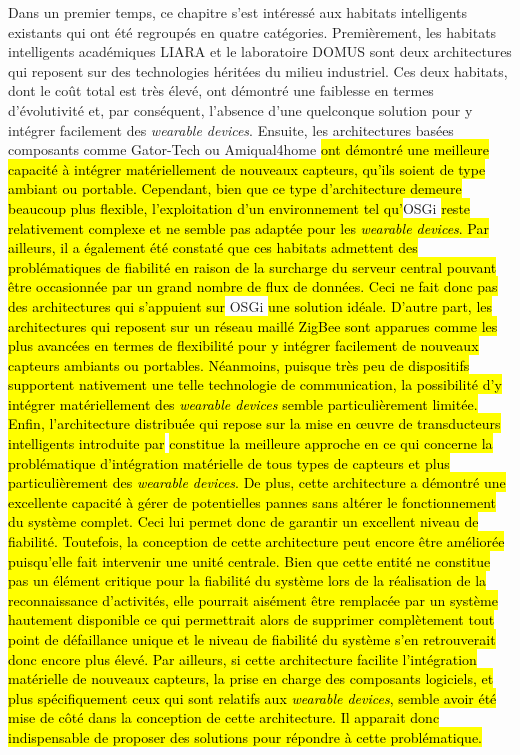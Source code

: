 Dans un premier temps, ce chapitre s'est intéressé aux habitats intelligents existants qui ont été regroupés en quatre catégories. Premièrement, les habitats intelligents académiques \acs{LIARA} et le laboratoire \acs{DOMUS} sont deux architectures qui reposent sur des technologies héritées du milieu industriel. Ces deux habitats, dont le coût total est très élevé, ont démontré une faiblesse en termes d'évolutivité et, par conséquent, l'absence d'une quelconque solution pour y intégrer facilement des \textit{wearable devices}. Ensuite, les architectures basées composants comme Gator-Tech ou Amiqual4home \hl{ont démontré une meilleure capacité à intégrer matériellement de nouveaux capteurs, qu'ils soient de type ambiant ou portable. Cependant, bien que ce type d'architecture demeure beaucoup plus flexible, l'exploitation d'un environnement tel qu'}\acs{OSGi} \hl{reste relativement complexe et ne semble pas adaptée pour les \textit{wearable devices}. Par ailleurs, il a également été constaté que ces habitats admettent des problématiques de fiabilité en raison de la surcharge du serveur central pouvant être occasionnée par un grand nombre de flux de données. Ceci ne fait donc pas des architectures qui s'appuient sur} \acs{OSGi} \hl{une solution idéale. D'autre part, les architectures qui reposent sur un réseau maillé ZigBee sont apparues comme les plus avancées en termes de flexibilité pour y intégrer facilement de nouveaux capteurs ambiants ou portables. Néanmoins, puisque très peu de dispositifs supportent nativement une telle technologie de communication, la possibilité d'y intégrer matériellement des \textit{wearable devices} semble particulièrement limitée. Enfin, l'architecture distribuée qui repose sur la mise en \oe{}uvre de transducteurs intelligents introduite par} \cite{Plantevin2018} \hl{constitue la meilleure approche en ce qui concerne la problématique d'intégration matérielle de tous types de capteurs et plus particulièrement des \textit{wearable devices}. De plus, cette architecture a démontré une excellente capacité à gérer de potentielles pannes sans altérer le fonctionnement du système complet. Ceci lui permet donc de garantir un excellent niveau de fiabilité. Toutefois, la conception de cette architecture peut encore être améliorée puisqu'elle fait intervenir une unité centrale. Bien que cette entité ne constitue pas un élément critique pour la fiabilité du système lors de la réalisation de la reconnaissance d'activités, elle pourrait aisément être remplacée par un système hautement disponible ce qui permettrait alors de supprimer complètement tout point de défaillance unique et le niveau de fiabilité du système s'en retrouverait donc encore plus élevé. Par ailleurs, si cette architecture facilite l'intégration matérielle de nouveaux capteurs, la prise en charge des composants logiciels, et plus spécifiquement ceux qui sont relatifs aux \textit{wearable devices}, semble avoir été mise de côté dans la conception de cette architecture. Il apparait donc indispensable de proposer des solutions pour répondre à cette problématique.}

